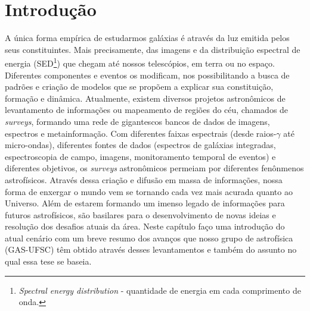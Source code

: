 



\chapter{Introdução}
\label{sec:intro}

A única forma empírica de estudarmos galáxias é através da luz emitida pelos seus constituintes. Mais precisamente, das imagens e da distribuição espectral de energia (SED\footnote{{\em Spectral energy distribution} - quantidade de energia em cada comprimento de onda.}) que chegam até nossos telescópios, em terra ou no espaço. Diferentes componentes e eventos os modificam, nos possibilitando a busca de padrões e criação de modelos que se propõem a explicar sua constituição, formação e dinâmica. Atualmente, existem diversos projetos astronômicos de levantamento de informações ou mapeamento de regiões do céu, chamados de {\em surveys}, formando uma rede de gigantescos bancos de dados de imagens, espectros e metainformação. Com diferentes faixas espectrais (desde raios-$\gamma$ até micro-ondas), diferentes fontes de dados (espectros de galáxias integradas, espectroscopia de campo, imagens, monitoramento temporal de eventos) e diferentes objetivos, os {\em surveys} astronômicos permeiam por diferentes fenônmenos astrofísicos. Através dessa criação e difusão em massa de informações, nossa forma de enxergar o mundo vem se tornando cada vez mais acurada quanto ao Universo. Além de estarem formando um imenso legado de informações para futuros astrofísicos, são basilares para o desenvolvimento de novas ideias e resolução dos desafios atuais da área. Neste capítulo faço uma introdução do atual cenário com um breve resumo dos avanços que nosso grupo de astrofísica (GAS-UFSC) têm obtido através desses levantamentos e também do assunto no qual essa tese se baseia.


